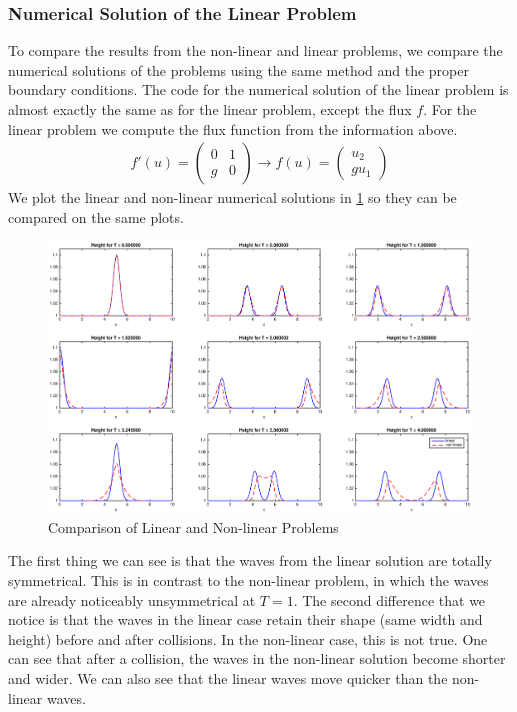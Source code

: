 \subsubsection{Numerical Solution of the Linear Problem}
To compare the results from the non-linear and linear problems, we compare the numerical solutions of the problems using the same method and the proper boundary conditions. The code for the numerical solution of the linear problem is almost exactly the same as for the linear problem, except the flux $f$. For the linear problem we compute the flux function from the information above. 
\begin{align*}
f'(u) = \begin{pmatrix}
0 & 1 \\
g & 0
\end{pmatrix} \rightarrow 
f(u) = \begin{pmatrix}
u_2 \\
gu_1
\end{pmatrix}
\end{align*}
We plot the linear and non-linear numerical solutions in \ref{compare} so they can be compared on the same plots. 
\begin{figure}
\begin{center}
\includegraphics[scale=0.35]{222comparison.eps}
\caption{Comparison of Linear and Non-linear Problems}
\label{compare}
\end{center}
\end{figure}
The first thing we can see is that the waves from the linear solution are totally symmetrical. This is in contrast to the non-linear problem, in which the waves are already noticeably unsymmetrical at $T=1$. The second difference that we notice is that the waves in the linear case retain their shape (same width and height) before and after collisions. In the non-linear case, this is not true. One can see that after a collision, the waves in the non-linear solution become shorter and wider. We can also see that the linear waves move quicker than the non-linear waves. 